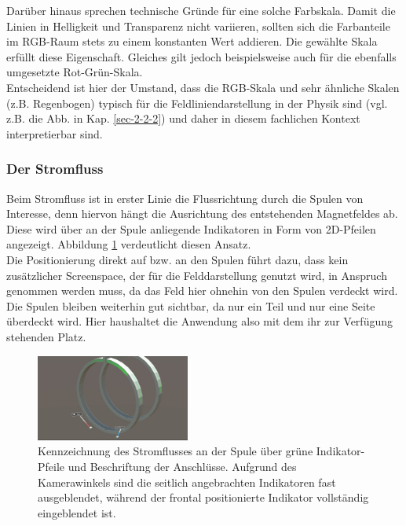 Darüber hinaus sprechen technische Gründe für eine solche Farbskala. Damit die Linien in Helligkeit und Transparenz nicht variieren, sollten sich die Farbanteile im RGB-Raum stets zu einem konstanten Wert addieren. Die gewählte Skala erfüllt diese Eigenschaft. Gleiches gilt jedoch beispielsweise auch für die ebenfalls umgesetzte Rot-Grün-Skala.\\
\noindent\hspace*{5mm}
Entscheidend ist hier der Umstand, dass die RGB-Skala und sehr ähnliche Skalen (z.B. Regenbogen) typisch für die Feldliniendarstellung in der Physik sind (vgl. z.B. die Abb. in Kap. \ref{sec-2-2-2}) und daher in diesem fachlichen Kontext interpretierbar sind.

\subsubsection{Der Stromfluss} 
\label{sec-4-2-3}
Beim Stromfluss ist in erster Linie die Flussrichtung durch die Spulen von Interesse, denn hiervon hängt die Ausrichtung des entstehenden Magnetfeldes ab. Diese wird über an der Spule anliegende Indikatoren in Form von 2D-Pfeilen angezeigt. Abbildung \ref{img:current} verdeutlicht diesen Ansatz.\\
\noindent\hspace*{5mm}
Die Positionierung direkt auf bzw. an den Spulen führt dazu, dass kein zusätzlicher Screenspace, der für die Felddarstellung genutzt wird, in Anspruch genommen werden muss, da das Feld hier ohnehin von den Spulen verdeckt wird. Die Spulen bleiben weiterhin gut sichtbar, da nur ein Teil und nur eine Seite überdeckt wird. Hier haushaltet die Anwendung also mit dem ihr zur Verfügung stehenden Platz.\\

\begin{figure}
	\centering
	\includegraphics[width=0.45\textwidth]{images/unity/current.jpg}
	\caption{Kennzeichnung des Stromflusses an der Spule über grüne Indikator-Pfeile und Beschriftung der Anschlüsse. Aufgrund des Kamerawinkels sind die seitlich angebrachten Indikatoren fast ausgeblendet, während der frontal positionierte Indikator vollständig eingeblendet ist.}
	\label{img:current}
\end{figure}

